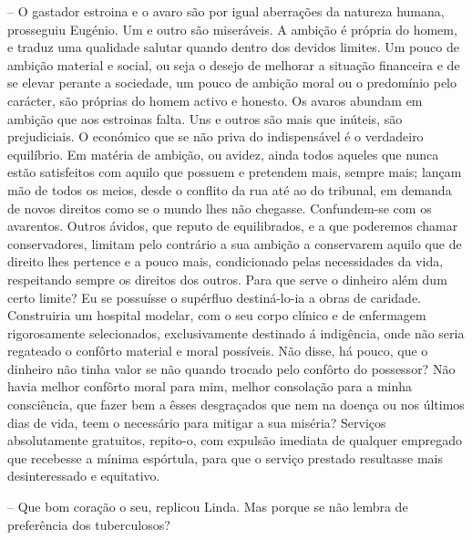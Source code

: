 \documentclass[9pt]{article}
\begin{document}
-- O gastador estroina e o avaro são por igual aberra\-ções da natureza humana, prosseguiu Eugé\-nio. Um e outro são miseráveis. A ambi\-ção é própria do homem,
e traduz uma qualidade salutar quan\-do dentro dos devidos limites. Um pouco
de ambi\-ção material e social, ou seja o desejo de me\-lhorar a situa\-ção financeira e de se elevar perante a sociedade, um pouco de ambi\-ção moral ou
o predomínio pelo carácter, são próprias do homem activo e honesto. Os
avaros abundam em ambi\-ção que aos estroinas falta. Uns e outros são mais
que inúteis, são prejudiciais. O económico que se não priva do indispensável é o verdadeiro equilíbrio. Em ma\-té\-ria de ambi\-ção, ou avidez, ainda
todos aqueles que nunca estão satisfeitos com aquilo que possuem e pretendem
mais, sempre mais; lan\-çam mão de todos os meios, desde o conflito da
rua até ao do tribunal, em demanda de novos direitos como se o mundo lhes
não chegasse. Confundem-se com os avarentos. Outros ávidos, que reputo de equilibrados, e a que poderemos chamar conservadores, limitam pelo contrário a
sua ambi\-ção a conservarem aquilo que de direito lhes pertence e a pouco
mais, condicionado pelas necessidades da vida, respeitando sempre os direitos dos outros. Para que serve o dinheiro além dum certo limite? Eu se
possuísse o supérfluo destiná-lo-ia a obras de caridade. Construiria um
hospital modelar, com o seu corpo clínico e de enfermagem rigorosamente
selecionados, exclusivamente destinado á indigência, onde não seria regateado o con\-fôr\-to material e moral possíveis. Não disse, há pouco, que o
dinheiro não tinha valor se não quan\-do trocado pelo con\-fôr\-to do possessor?
Não havia me\-lhor con\-fôr\-to moral para mim, me\-lhor consola\-ção para a minha
consciência, que fazer bem a êsses desgraçados que nem na doença ou nos
últimos dias de vida, teem o necessário para mitigar a sua miséria? Serviços absolutamente gratuitos, repito-o, com expulsão imediata de qualquer empregado que recebesse a mínima espórtula, para que o serviço prestado resultasse mais desinteressado e equitativo.

-- Que bom cora\-ção o seu, replicou Linda. Mas porque se não lembra de
preferência dos tuberculosos?
\end{document}
